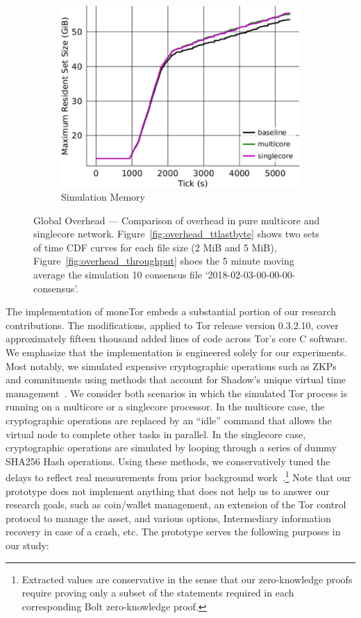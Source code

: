 \begin{figure}[t]
\begin{subfigure}[t]{0.32\textwidth}
    \includegraphics[clip, width=1.0\textwidth]{images/overhead_memory.pdf}
    \caption{Simulation Memory}
    \label{fig:overhead_shadow}
  \end{subfigure}
  \caption{Global Overhead --- Comparison of overhead in pure multicore and singlecore network.
    Figure~\ref{fig:overhead_ttlastbyte} shows two sets of time CDF curves for each file size (2 MiB and 5 MiB), Figure~\ref{fig:overhead_throughput} shoes the 5 minute moving average the simulation 10 consensus file `2018-02-03-00-00-00-consensus'.}
  \label{fig:overhead}
\end{figure}

The implementation of moneTor embeds a substantial portion of our research contributions.
The modifications, applied to Tor release version 0.3.2.10, cover approximately fifteen thousand added lines of code across Tor's core C software.
We emphasize that the implementation is engineered solely for our experiments.
Most notably, we simulated expensive cryptographic operations such as ZKPs and commitments using methods that account for Shadow's unique virtual time management~\cite{jansen2011shadow}.
We consider both scenarios in which the simulated Tor process is running on a multicore or a singlecore processor.
In the multicore case, the cryptographic operations are replaced by an ``idle'' command that allows the virtual node to complete other tasks in parallel.
In the singlecore case, cryptographic operations are simulated by looping through a series of dummy SHA256 Hash operations.
Using these methods, we conservatively tuned the delays to reflect real measurements from prior background work~\cite{green2017bolt}.\footnote{Extracted values are conservative in the sense that our zero-knowledge proofs require proving only a subset of the statements required in each corresponding Bolt zero-knowledge proof.}
Note that our prototype does not implement anything that does not help us to answer our research goals, such as coin/wallet management, an extension of the Tor control protocol to manage the asset, and various options, Intermediary information recovery in case of a crash, etc.
The prototype serves the following purposes in our study:

